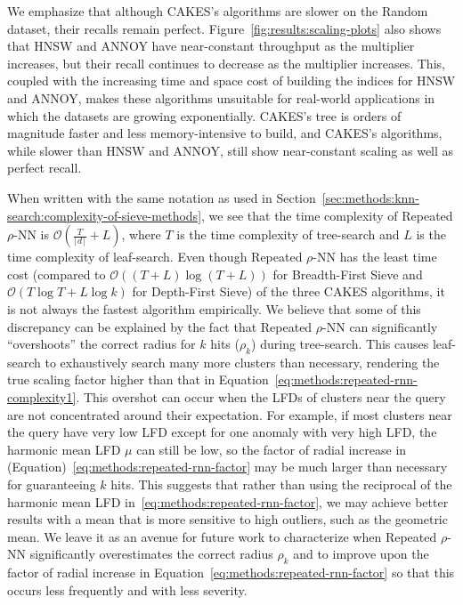 We emphasize that although CAKES's algorithms are slower on the Random dataset, their recalls remain perfect.
Figure~\ref{fig:results:scaling-plots} also shows that HNSW and ANNOY have near-constant throughput as the multiplier increases, but their recall continues to decrease as the multiplier increases.
This, coupled with the increasing time and space cost of building the indices for HNSW and ANNOY, makes these algorithms unsuitable for real-world applications in which the datasets are growing exponentially.
CAKES's tree is orders of magnitude faster and less memory-intensive to build, and CAKES's algorithms, while slower than HNSW and ANNOY, still show near-constant scaling as well as perfect recall.

When written with the same notation as used in Section~\ref{sec:methods:knn-search:complexity-of-sieve-methods}, we see that the time complexity of Repeated $\rho$-NN is $\mathcal{O}(\tfrac{T}{\lceil d \rceil} + L)$, where $T$ is the time complexity of tree-search and $L$ is the time complexity of leaf-search.
Even though Repeated $\rho$-NN has the least time cost (compared to $\mathcal{O}\left((T + L)\log{(T+L)}\right)$ for Breadth-First Sieve and $\mathcal{O}(T\log{T} + L\log{k})$ for Depth-First Sieve) of the three CAKES algorithms, it is not always the fastest algorithm empirically.
We believe that some of this discrepancy can be explained by the fact that Repeated $\rho$-NN can significantly ``overshoots'' the correct radius for $k$ hits ($\rho_k$) during tree-search.
This causes leaf-search to exhaustively search many more clusters than necessary, rendering the true scaling factor higher than that in Equation~\ref{eq:methods:repeated-rnn-complexity1}.
This overshot can occur when the LFDs of clusters near the query are not concentrated around their expectation.
For example, if most clusters near the query have very low LFD except for one anomaly with very high LFD,
the harmonic mean LFD $\mu$ can still be low, so the factor of radial increase in (Equation)~\ref{eq:methods:repeated-rnn-factor} may be much larger than necessary for guaranteeing $k$ hits.
This suggests that rather than using the reciprocal of the harmonic mean LFD in~\ref{eq:methods:repeated-rnn-factor}, we may achieve better results with a mean that is more sensitive to high outliers, such as the geometric mean.
We leave it as an avenue for future work to characterize when Repeated $\rho$-NN significantly overestimates the correct radius $\rho_k$ and to improve upon the factor of radial increase in Equation~\ref{eq:methods:repeated-rnn-factor} so that this occurs less frequently and with less severity.


